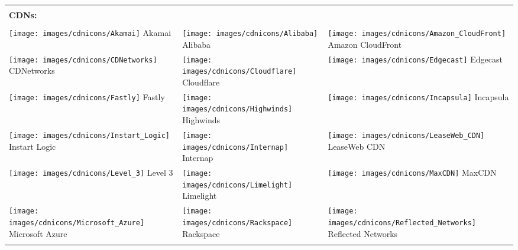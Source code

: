 \begin{table}[tbp]
\begin{tabular}{|llll|llll|}
\hline
\end{tabular}
\begin{tabular}{|lll|}
&& \\
\textbf{CDNs:} && \\
&& \\
\texttt{[image: images/cdnicons/Akamai]} Akamai &
\texttt{[image: images/cdnicons/Alibaba]} Alibaba &
\texttt{[image: images/cdnicons/Amazon\_CloudFront]} Amazon CloudFront \\
\texttt{[image: images/cdnicons/CDNetworks]} CDNetworks &
\texttt{[image: images/cdnicons/Cloudflare]} Cloudflare &
\texttt{[image: images/cdnicons/Edgecast]} Edgecast \\
\texttt{[image: images/cdnicons/Fastly]} Fastly &
\texttt{[image: images/cdnicons/Highwinds]} Highwinds &
\texttt{[image: images/cdnicons/Incapsula]} Incapsula \\
\texttt{[image: images/cdnicons/Instart\_Logic]} Instart Logic &
\texttt{[image: images/cdnicons/Internap]} Internap &
\texttt{[image: images/cdnicons/LeaseWeb\_CDN]} LeaseWeb CDN \\
\texttt{[image: images/cdnicons/Level\_3]} Level 3 &
\texttt{[image: images/cdnicons/Limelight]} Limelight &
\texttt{[image: images/cdnicons/MaxCDN]} MaxCDN \\
\texttt{[image: images/cdnicons/Microsoft\_Azure]} Microsoft Azure &
\texttt{[image: images/cdnicons/Rackspace]} Rackspace &
\texttt{[image: images/cdnicons/Reflected\_Networks]} Reflected Networks  \\
&& \\
\hline
\end{tabular}
\end{table}
